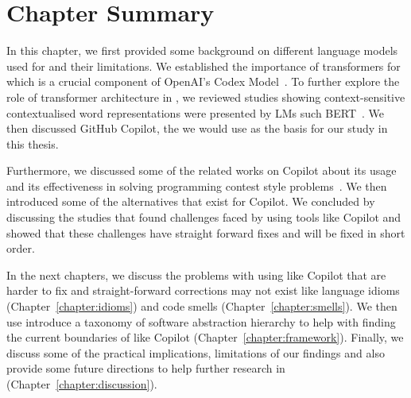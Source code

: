\section{Chapter Summary}
In this chapter, we first provided some background on different language models used for \cct{} and their limitations. We established the importance of transformers for \cct{} which is a crucial component of OpenAI's Codex Model~\cite{copilot}. To further explore the role of transformer architecture in \cct{}, we reviewed studies showing context-sensitive contextualised word representations were presented by LMs such BERT~\cite{bert}.
We then discussed GitHub Copilot, the \cct{} we would use as the basis for our study in this thesis.

Furthermore, we discussed some of the related works on Copilot about its usage~\cite{Vaithilingam2022} and its effectiveness in solving programming contest style problems~\cite{empirical_eval}. We then introduced some of the alternatives that exist for Copilot.
We concluded by discussing the studies that found challenges faced by using \cct{} tools like Copilot and showed that these challenges have straight forward fixes and will be fixed in short order. 

In the next chapters, we discuss the problems with using \cct{} like Copilot that are harder to fix and straight-forward corrections may not exist like language idioms (Chapter~\ref{chapter:idioms}) and code smells (Chapter~\ref{chapter:smells}). 
We then use introduce a taxonomy of software abstraction hierarchy to help with finding the current boundaries of \cct{} like Copilot (Chapter~\ref{chapter:framework}). 
Finally, we discuss some of the practical implications, limitations of our findings and also provide some future directions to help further research in \cct{} (Chapter~\ref{chapter:discussion}).